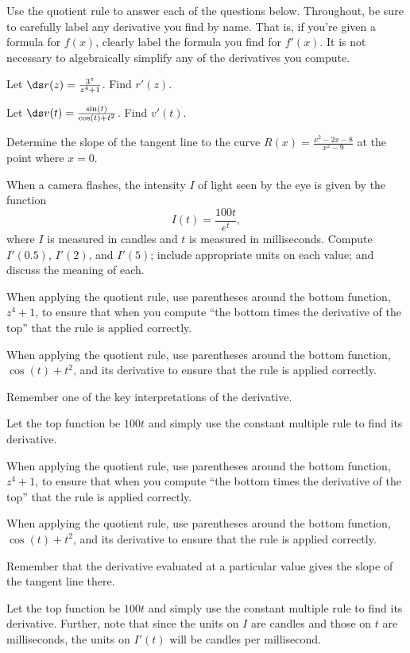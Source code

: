\begin{activity} \label{A:2.3.2} Use the quotient rule to answer each of the questions below.  Throughout, be sure to carefully label any derivative you find by name.  
That is, if you're given a formula for $f(x)$, clearly label the formula you find for $f'(x)$.  It is not necessary to algebraically simplify any of the derivatives you compute.
\ba
	\item Let $\ds r(z)=\frac{3^z}{z^4 + 1}$.  Find $r'(z)$.
	\item Let $\ds v(t) = \frac{\sin(t)}{\cos(t) + t^2}$.  Find $v'(t)$.
	\item Determine the slope of the tangent line to the curve $\displaystyle R(x) = \frac{x^2 - 2x - 8}{x^2 - 9}$ at the point where $x = 0$.
	\item When a camera flashes, the intensity $I$ of light seen by the eye is given by the function
$$I(t) = \frac{100t}{e^t},$$
where $I$ is measured in candles and $t$ is measured in milliseconds.  Compute $I'(0.5)$, $I'(2)$, and $I'(5)$; include appropriate units on each value; and discuss the meaning of each.
\ea
\end{activity}
\begin{smallhint}
\ba
	\item When applying the quotient rule, use parentheses around the bottom function, $z^4 + 1$, to ensure that when you compute ``the bottom times the derivative of the top'' that the rule is applied correctly.
	\item When applying the quotient rule, use parentheses around the bottom function, $\cos(t) + t^2$, and its derivative to ensure that the rule is applied correctly.
	\item Remember one of the key interpretations of the derivative.
	\item Let the top function be $100t$ and simply use the constant multiple rule to find its derivative.
\ea
\end{smallhint}
\begin{bighint}
\ba
	\item When applying the quotient rule, use parentheses around the bottom function, $z^4 + 1$, to ensure that when you compute ``the bottom times the derivative of the top'' that the rule is applied correctly.
	\item When applying the quotient rule, use parentheses around the bottom function, $\cos(t) + t^2$, and its derivative to ensure that the rule is applied correctly.
	\item Remember that the derivative evaluated at a particular value gives the slope of the tangent line there.
	\item Let the top function be $100t$ and simply use the constant multiple rule to find its derivative.  Further, note that since the units on $I$ are candles and those on $t$ are milliseconds, the units on $I'(t)$ will be candles per millisecond.
\ea
\end{bighint}
